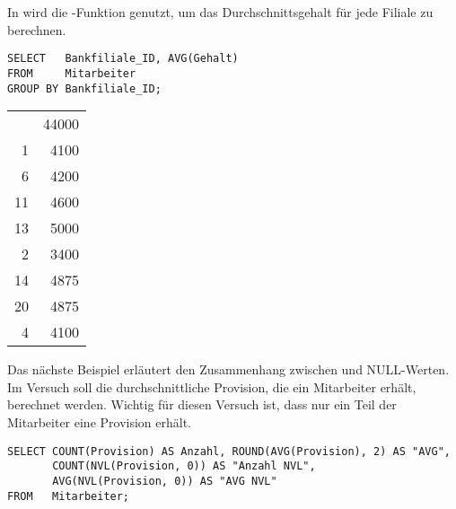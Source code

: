         In  wird die -Funktion genutzt, um das Durchschnittsgehalt für jede Filiale zu berechnen.
        \begin{lstlisting}[language=oracle_sql,caption={Die AVG-Funktion},label=sql05_08]
SELECT   Bankfiliale_ID, AVG(Gehalt)
FROM     Mitarbeiter
GROUP BY Bankfiliale_ID;
        \end{lstlisting}
\clearpage
        \begin{center}
          \begin{small}
            \tablehead{}
            \begin{msoraclesql}
              \begin{supertabular}{rr}
                & 44000 \\
                1 & 4100 \\
                6 & 4200 \\
                11 & 4600 \\
                13 & 5000 \\
                2 & 3400 \\
                14 & 4875 \\
                20 & 4875 \\
                4 & 4100 \\
              \end{supertabular}
            \end{msoraclesql}
          \end{small}
        \end{center}
        Das nächste Beispiel erläutert den Zusammenhang zwischen  und NULL-Werten. Im Versuch soll die durchschnittliche Provision, die ein Mitarbeiter erhält, berechnet werden. Wichtig für diesen Versuch ist, dass nur ein Teil der Mitarbeiter eine Provision erhält.
        \begin{lstlisting}[language=oracle_sql,caption={AVG und NULL-Werte in Oracle},label=sql05_09]
SELECT COUNT(Provision) AS Anzahl, ROUND(AVG(Provision), 2) AS "AVG",
       COUNT(NVL(Provision, 0)) AS "Anzahl NVL",
       AVG(NVL(Provision, 0)) AS "AVG NVL"
FROM   Mitarbeiter;
        \end{lstlisting}
